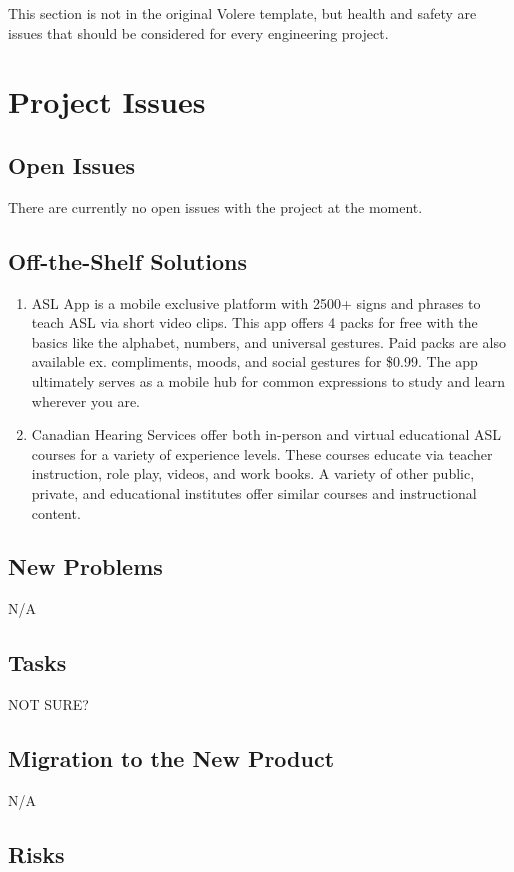 \documentclass[12pt, titlepage]{article}
\begin{document}
This section is not in the original Volere template, but health and safety are
issues that should be considered for every engineering project.

\section{Project Issues}

\subsection{Open Issues}
There are currently no open issues with the project at the moment.
\subsection{Off-the-Shelf Solutions}
\begin{enumerate}
    \item ASL App is a mobile exclusive platform with 2500+ signs and phrases to teach ASL via short video clips. This app offers 4 packs for free with the basics like the alphabet, numbers, and universal gestures. Paid packs are also available ex. compliments, moods, and social gestures for \$0.99. The app ultimately serves as a mobile hub for common expressions to study and learn wherever you are.
    \item Canadian Hearing Services offer both in-person and virtual educational ASL courses for a variety of experience levels. These courses educate via teacher instruction, role play, videos, and work books.
    A variety of other public, private, and educational institutes offer similar courses and instructional content.
\end{enumerate}

\subsection{New Problems}

N/A

\subsection{Tasks}
NOT SURE?
\subsection{Migration to the New Product}
N/A
\subsection{Risks}
\end{document}
